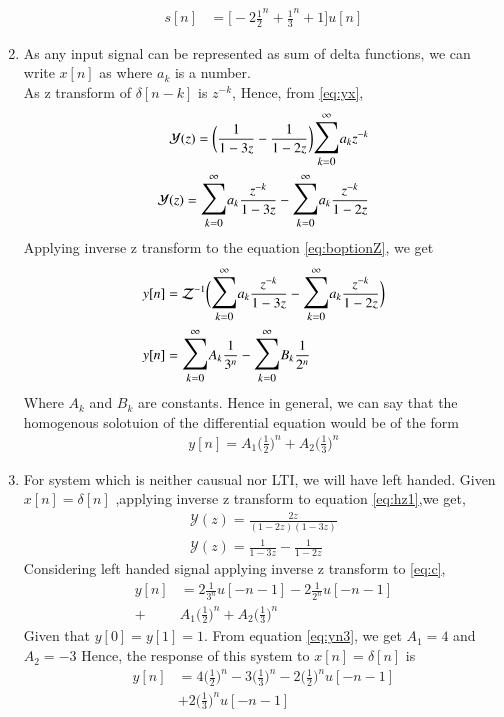 \documentclass[journal,12pt,two column]{IEEEtran}
\begin{document}
\begin{enumerate}
\begin{align}
s[n]&=\bigg[-2\frac{1}{2}^{n}+\frac{1}{3}^{n}+1\bigg]u[n]
\end{align}
\item As any input signal can be represented as sum of delta functions, we can write $x[n]$ as 
where $a_k$ is a number.\\
As z transform of $\delta[n-k]$ is $z^{-k}$, Hence, from \eqref{eq:yx},
\begin{align}
\mathcal{Y}(z)=\bigg(\frac{1}{1-3z}-\frac{1}{1-2z}\bigg) \mathlarger{\mathlarger{\sum}}_{k=0}^{\infty}a_k z^{-k}\\
\label{eq:boptionZ}
\mathcal{Y}(z)=\mathlarger{\mathlarger{\sum}}_{k=0}^{\infty}a_k \frac{z^{-k}}{1-3z}-\mathlarger{\mathlarger{\sum}}_{k=0}^{\infty}a_k \frac{z^{-k}}{1-2z}
\end{align}  
Applying inverse z transform to the equation \eqref{eq:boptionZ}, we get
\begin{align}
y[n]&=\mathcal{Z}^{-1}\bigg(\mathlarger{\mathlarger{\sum}}_{k=0}^{\infty}a_k \frac{z^{-k}}{1-3z}-\mathlarger{\mathlarger{\sum}}_{k=0}^{\infty}a_k \frac{z^{-k}}{1-2z}\bigg)\\
y[n]&=\mathlarger{\mathlarger{\sum}}_{k=0}^{\infty}A_k \frac{1}{3^{n}}-\mathlarger{\mathlarger{\sum}}_{k=0}^{\infty}B_k \frac{1}{2^{n}}
\end{align}  
Where $A_k$ and $B_k$ are constants.
Hence in general, we can say that the homogenous solotuion of the differential equation would be of the form 
\begin{align}
y[n]=A_1 \bigg(\frac{1}{2}\bigg)^n + A_2 \bigg(\frac{1}{3}\bigg)^n
\end{align}
\item For system which is neither causual nor LTI, we will have left handed. Given $x[n]=\delta[n]$ ,applying inverse z transform to equation \eqref{eq:hz1},we get,
\begin{align}
\mathcal{Y}(z)=\frac{2z}{(1-2z)(1-3z)}\\
\label{eq:c}
\mathcal{Y}(z)=\frac{1}{1-3z}-\frac{1}{1-2z}
\end{align}
Considering left handed signal applying inverse z transform to \eqref{eq:c}, 
\begin{align}
	\label{eq:yn3}
	y[n]&=2\frac{1}{3^{n}}u[-n-1]-2\frac{1}{2^{n}}u[-n-1]\\+&A_1 \bigg(\frac{1}{2}\bigg)^n + A_2 \bigg(\frac{1}{3}\bigg)^n
\end{align}
Given that $y[0]=y[1]=1$. From equation \eqref{eq:yn3}, we get $A_1=4$ and $A_2=-3$
Hence, the response of this system to $x[n]=\delta[n]$ is 
\begin{align}
y[n]&=4\bigg(\frac{1}{2}\bigg)^n-3\bigg(\frac{1}{3}\bigg)^{n}-2\bigg(\frac{1}{2}\bigg)^{n}u[-n-1]\\&+2\bigg(\frac{1}{3}\bigg)^{n}u[-n-1]
\end{align}
		\end{enumerate}
\end{document}
